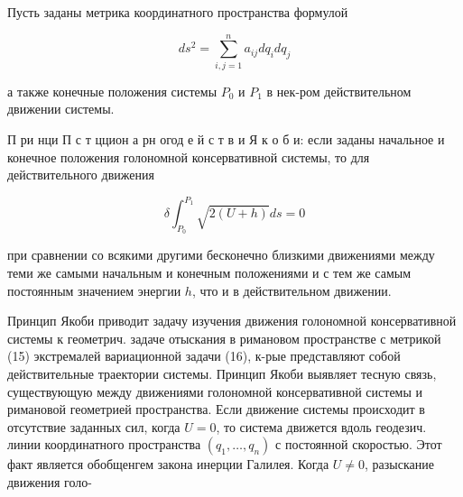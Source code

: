 \documentclass[10pt]{article}
\begin{document}
Пусть заданы метрика координатного пространства формулой



\[

d s^{2}=\sum_{i, j=1}^{n} a_{i j} d q_{i} d q_{j}

\]



а также конечные положения системы $P_{0}$ и $P_{1}$ в нек-ром действительном движении системы.



П ри нци П с т ццион а рн огод е й с т в и Я к о б и: если заданы начальное и конечное положения голономной консервативной системы, то для действительного движения



\[

\delta \int_{P_{0}}^{P_{1}} \sqrt{2(U+h)} d s=0

\]



при сравнении со всякими другими бесконечно близкими движениями между теми же самыми начальным и конечным положениями и с тем же самым постоянным значением энергии $h$, что и в действительном движении.



Принцип Якоби приводит задачу изучения движения голономной консервативной системы к геометрич. задаче отыскания в римановом пространстве с метрикой (15) экстремалей вариационной задачи (16), к-рые представляют собой действительные траектории системы. Принцип Якоби выявляет тесную связь, существующую между движениями голономной консервативной системы и римановой геометрией пространства. Если движение системы происходит в отсутствие заданных сил, когда $U=0$, то система движется вдоль геодезич. линии координатного пространства $\left(q_{1}, \ldots, q_{n}\right)$ с постоянной скоростью. Этот факт является обобщенгем закона инерции Галилея. Когда $U \neq 0$, разыскание движения голо-
\end{document}
